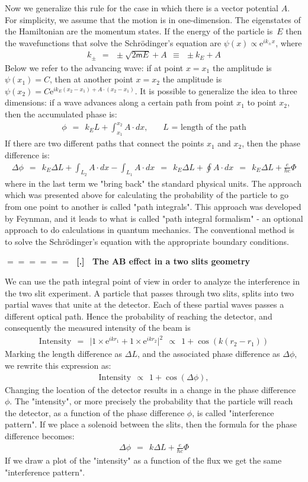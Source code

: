 \documentclass[onecolumn,fleqn]{revtex4}
\newcommand{\eexp}{\mathrm{e}^}
\newcommand{\mass}{\mathsf{m}}
\newcommand{\beq}{\begin{eqnarray}}
\newcommand{\eeq}{\end{eqnarray}}
\renewcommand{\thesubsection}{\arabic{subsection}}
\renewcommand{\thesubsubsection}{\arabic{subsubsection}}
\newcommand{\sheadC}[1]
{
\addtocounter{subsubsection}{1}
\vspace{5mm}
{\Large\bf $=\!=\!=\!=\!=\!=\;$ [\thesubsection.\thesubsubsection] \ #1}  
\nopagebreak
\phantomsection
}
\begin{document}
Now we generalize this rule for the case in which 
there is a vector potential $A$. 
For simplicity, we assume that the motion 
is in one-dimension. The eigenstates of the Hamiltonian are 
the momentum states. 
If the energy of the particle is~$E$ then the wavefunctions   
that solve the Schr\"{o}dinger's equation 
are ${\psi (x) \propto \eexp{ik_{\pm} x}}$, where  
\beq
k_{\pm} \ \ = \ \  \pm \sqrt {2\mass E } + A \ \  \equiv \ \  \pm k_E + A 
\eeq
Below we refer to the advancing wave:  
if at point ${x=x_1}$ the amplitude is ${\psi (x_1)=C}$, 
then at another point ${x=x_2}$ the amplitude 
is ${\psi (x_2)= C \eexp{ ik_E(x_2-x_1) + A \cdot (x_2-x_1) }}$. 
It is possible to generalize the idea to three 
dimensions: if a wave advances along a certain path 
from point $x_1$ to point $x_2$, then the accumulated phase is:
\beq
\phi \ \ = \ \  k_E L + \int_{x_1}^{x_2} A \cdot dx, 
\ \ \ \ \ \ \ \ \mbox{$L$ = length of the path}  
\eeq
If there are two different paths that connect 
the points ${x_1}$ and ${x_2}$, then the phase difference is:
\beq
\Delta \phi  \ \ = \ \ k_E \Delta L + \int_{L_2} A \cdot dx - \int_{L_1} A \cdot dx  
\ \ = \ \ k_E \Delta L + \oint A \cdot dx 
\ \ = \ \ k_E \Delta L + \frac{e}{\hbar c}\Phi 
\eeq
where in the last term we "bring back" the standard physical units. 
The approach which was presented above for calculating 
the probability of the particle to go from one point 
to another is called "path integrals". This approach 
was developed by Feynman, and it leads to what is 
called "path integral formalism" - an optional approach 
to do calculations in quantum mechanics. The conventional method 
is to solve the Schr\"{o}dinger's equation with the 
appropriate boundary conditions. 



\sheadC{The AB effect in a two slits geometry} 

We can use the path integral point of view 
in order to analyze the interference 
in the two slit experiment. A particle  
that passes through two slits, splits into two partial waves 
that unite at the detector. 
Each of these partial waves passes a different optical path.
Hence the probability of reaching the detector, 
and consequently the measured intensity of the beam is 
\beq
\mbox{Intensity} 
\ \ = \ \ \Big|1\times \eexp{ ikr_1} + 1\times \eexp{ikr_2}\Big|^2 
\ \ \propto \ \ 1+\cos(k(r_2-r_1)) 
\eeq
Marking the length difference as $\Delta L$, 
and the associated phase difference as ${\Delta\phi}$, 
we rewrite this expression as:
\beq
\mbox{Intensity} \ \ \propto \ \ 1 + \cos(\Delta\phi), 
\eeq
Changing the location of the detector results in a change in the phase difference ${\phi}$. 
The "intensity", or more precisely the probability that the particle will reach the detector, 
as a function of the phase difference ${\phi}$, is called "interference pattern". 
If we place a solenoid between the slits, then the formula for the phase difference becomes:
\beq
\Delta\phi \ \ = \ \ k \Delta L + \frac{e}{\hbar c}\Phi 
\eeq
If we draw a plot of the "intensity" as a function 
of the flux we get the same "interference pattern".
\end{document}
